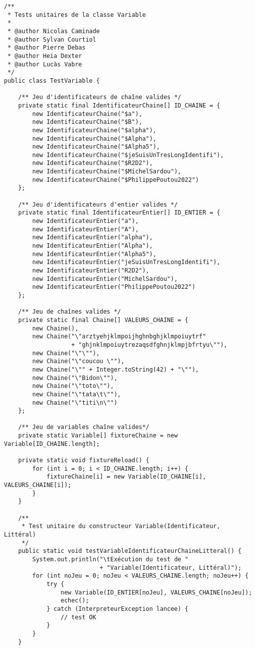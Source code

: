 \begin{enum}
\begin{verbatim}
/** 
 * Tests unitaires de la classe Variable
 *  
 * @author Nicolas Caminade
 * @author Sylvan Courtiol
 * @author Pierre Debas
 * @author Heia Dexter
 * @author Lucàs Vabre
 */
public class TestVariable {
    
    /** Jeu d'identificateurs de chaîne valides */
    private static final IdentificateurChaine[] ID_CHAINE = {
        new IdentificateurChaine("$a"),
        new IdentificateurChaine("$B"),
        new IdentificateurChaine("$alpha"),
        new IdentificateurChaine("$Alpha"),
        new IdentificateurChaine("$Alpha5"),
        new IdentificateurChaine("$jeSuisUnTresLongIdentifi"),
        new IdentificateurChaine("$R2D2"),
        new IdentificateurChaine("$MichelSardou"),
        new IdentificateurChaine("$PhilippePoutou2022")
    };

    /** Jeu d'identificateurs d'entier valides */
    private static final IdentificateurEntier[] ID_ENTIER = {
        new IdentificateurEntier("a"),
        new IdentificateurEntier("A"),
        new IdentificateurEntier("alpha"),
        new IdentificateurEntier("Alpha"),
        new IdentificateurEntier("Alpha5"),
        new IdentificateurEntier("jeSuisUnTresLongIdentifi"),
        new IdentificateurEntier("R2D2"),
        new IdentificateurEntier("MichelSardou"),
        new IdentificateurEntier("PhilippePoutou2022")
    };
    
    /** Jeu de chaînes valides */
    private static final Chaine[] VALEURS_CHAINE = {
        new Chaine(),
        new Chaine("\"arztyehjklmpoijhghnbghjklmpoiuytrf" 
                   + "ghjnklmpoiuytrezaqsdfghnjklmpjbfrtyu\""), 
        new Chaine("\"\""),
        new Chaine("\"coucou \""),
        new Chaine("\"" + Integer.toString(42) + "\""),
        new Chaine("\"Bidon\""),
        new Chaine("\"toto\""),
        new Chaine("\"tata\t\""),
        new Chaine("\"titi\n\"")
    };
    
    /** Jeu de variables chaîne valides*/
    private static Variable[] fixtureChaine = new Variable[ID_CHAINE.length];   
    
    private static void fixtureReload() {
        for (int i = 0; i < ID_CHAINE.length; i++) {
            fixtureChaine[i] = new Variable(ID_CHAINE[i], VALEURS_CHAINE[i]); 
        }
    }
    
    /** 
     * Test unitaire du constructeur Variable(Identificateur, Littéral)
     */
    public static void testVariableIdentificateurChaineLitteral() {
        System.out.println("\tExécution du test de "
                           + "Variable(Identificateur, Littéral)");
        for (int noJeu = 0; noJeu < VALEURS_CHAINE.length; noJeu++) {
            try {
                new Variable(ID_ENTIER[noJeu], VALEURS_CHAINE[noJeu]);
                echec();
            } catch (InterpreteurException lancee) {
                // test OK
            }
        }
    }
    

\end{verbatim}
\end{enum}
